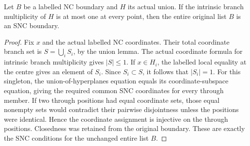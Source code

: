 \begin{theorem}
\label{hir:labelled-nc-count-one-snc}
\leanok
Let $B$ be a labelled NC boundary and $H$ its actual union. If the
intrinsic branch multiplicity of $H$ is at most one at every point,
then the entire original list $B$ is an SNC boundary.
\end{theorem}
\begin{proof}
Fix $x$ and the actual labelled NC coordinates. Their total coordinate
branch set is $S=\bigcup_iS_i$, by the union lemma. The actual
coordinate formula for intrinsic branch multiplicity gives
$|S|\le1$. If $x\in H_i$, the labelled local equality at the centre
gives an element of $S_i$. Since $S_i\subset S$, it follows that
$|S_i|=1$. For this singleton, the union-of-hyperplanes equation equals
its coordinate-subspace equation, giving the required common SNC
coordinates for every through member. If two through positions had
equal coordinate sets, those equal nonempty sets would contradict
their pairwise disjointness unless the positions were identical.
Hence the coordinate assignment is injective on the through positions.
Closedness was retained from the original boundary. These are exactly
the SNC conditions for the unchanged entire list $B$.
\end{proof}
